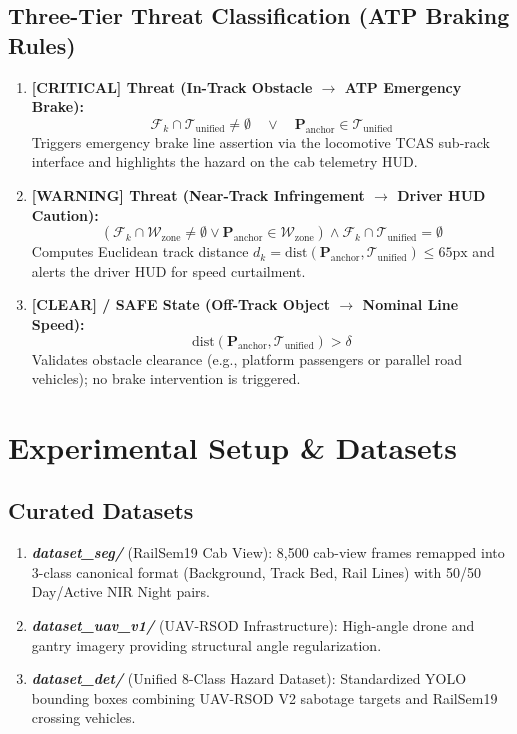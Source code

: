 \documentclass[conference]{IEEEtran}
\begin{document}
\subsection{Three-Tier Threat Classification (ATP Braking Rules)}
\begin{enumerate}
    \item \textbf{[CRITICAL] Threat (In-Track Obstacle $\rightarrow$ ATP Emergency Brake):}
    \begin{equation}
    \mathcal{F}_k \cap \mathcal{T}_{\text{unified}} \neq \emptyset \quad \lor \quad \mathbf{P}_{\text{anchor}} \in \mathcal{T}_{\text{unified}}
    \end{equation}
    Triggers emergency brake line assertion via the locomotive TCAS sub-rack interface and highlights the hazard on the cab telemetry HUD.
    \item \textbf{[WARNING] Threat (Near-Track Infringement $\rightarrow$ Driver HUD Caution):}
    \begin{equation}
    \left(\mathcal{F}_k \cap \mathcal{W}_{\text{zone}} \neq \emptyset \lor \mathbf{P}_{\text{anchor}} \in \mathcal{W}_{\text{zone}}\right) \land \mathcal{F}_k \cap \mathcal{T}_{\text{unified}} = \emptyset
    \end{equation}
    Computes Euclidean track distance $d_k = \text{dist}(\mathbf{P}_{\text{anchor}}, \mathcal{T}_{\text{unified}}) \le 65\text{px}$ and alerts the driver HUD for speed curtailment.
    \item \textbf{[CLEAR] / SAFE State (Off-Track Object $\rightarrow$ Nominal Line Speed):}
    \begin{equation}
    \text{dist}(\mathbf{P}_{\text{anchor}}, \mathcal{T}_{\text{unified}}) > \delta
    \end{equation}
    Validates obstacle clearance (e.g., platform passengers or parallel road vehicles); no brake intervention is triggered.
\end{enumerate}



\section{Experimental Setup \& Datasets}

\subsection{Curated Datasets}
\begin{enumerate}
    \item \textbf{\textit{dataset\_seg/}} (RailSem19 Cab View): 8,500 cab-view frames remapped into 3-class canonical format (Background, Track Bed, Rail Lines) with 50/50 Day/Active NIR Night pairs.
    \item \textbf{\textit{dataset\_uav\_v1/}} (UAV-RSOD Infrastructure): High-angle drone and gantry imagery providing structural angle regularization.
    \item \textbf{\textit{dataset\_det/}} (Unified 8-Class Hazard Dataset): Standardized YOLO bounding boxes combining UAV-RSOD V2 sabotage targets and RailSem19 crossing vehicles.
\end{enumerate}
\end{document}
